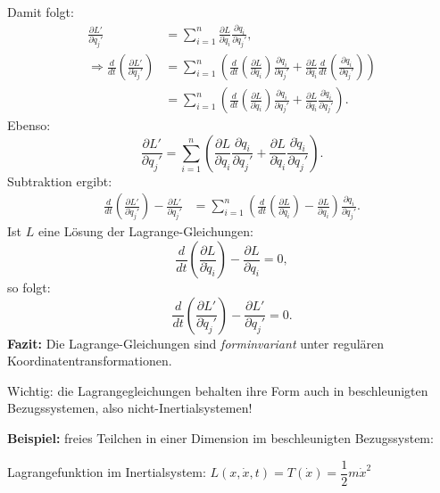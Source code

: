 \documentclass[10pt, letterpaper]{article}
\begin{document}
Damit folgt:
\begin{align*}
\frac{\partial L'}{\partial \dot{q}_j'} 
&= \sum_{i=1}^n \frac{\partial L}{\partial \dot{q}_i} \frac{\partial q_i}{\partial q_j'}, \\
\Rightarrow \frac{d}{dt} \left( \frac{\partial L'}{\partial \dot{q}_j'} \right)
&= \sum_{i=1}^n \left( 
  \frac{d}{dt} \left( \frac{\partial L}{\partial \dot{q}_i} \right) \frac{\partial q_i}{\partial q_j'} 
+ \frac{\partial L}{\partial \dot{q}_i} \frac{d}{dt} \left( \frac{\partial q_i}{\partial q_j'} \right) 
\right) \\
&= \sum_{i=1}^n \left( 
  \frac{d}{dt} \left( \frac{\partial L}{\partial \dot{q}_i} \right) \frac{\partial q_i}{\partial q_j'} 
+ \frac{\partial L}{\partial \dot{q}_i} \frac{\partial \dot{q}_i}{\partial q_j'}
\right).
\end{align*}
Ebenso:
\[
\frac{\partial L'}{\partial q_j'} 
= \sum_{i=1}^n \left( 
  \frac{\partial L}{\partial q_i} \frac{\partial q_i}{\partial q_j'} 
+ \frac{\partial L}{\partial \dot{q}_i} \frac{\partial \dot{q}_i}{\partial q_j'} 
\right).
\]
Subtraktion ergibt:
\begin{align*}
\frac{d}{dt} \left( \frac{\partial L'}{\partial \dot{q}_j'} \right) - \frac{\partial L'}{\partial q_j'}
&= \sum_{i=1}^n \left( 
  \frac{d}{dt} \left( \frac{\partial L}{\partial \dot{q}_i} \right) 
  - \frac{\partial L}{\partial q_i} \right) \frac{\partial q_i}{\partial q_j'}.
\end{align*}
Ist \( L \) eine Lösung der Lagrange-Gleichungen:
\[
\frac{d}{dt} \left( \frac{\partial L}{\partial \dot{q}_i} \right) - \frac{\partial L}{\partial q_i} = 0,
\]
so folgt:
\[
\frac{d}{dt} \left( \frac{\partial L'}{\partial \dot{q}_j'} \right) - \frac{\partial L'}{\partial q_j'} = 0.
\]
\textbf{Fazit:}  
Die Lagrange-Gleichungen sind \emph{forminvariant} unter regulären Koordinatentransformationen.

Wichtig: die Lagrangegleichungen behalten ihre Form auch in beschleunigten Bezugssystemen, also nicht-Inertialsystemen!




\textbf{Beispiel:} freies Teilchen in einer Dimension im beschleunigten Bezugssystem:


Lagrangefunktion im Inertialsystem:
$L(x,\dot{x},t) = T(\dot{x}) = \dfrac{1}{2}m\dot{x}^2$
\end{document}
